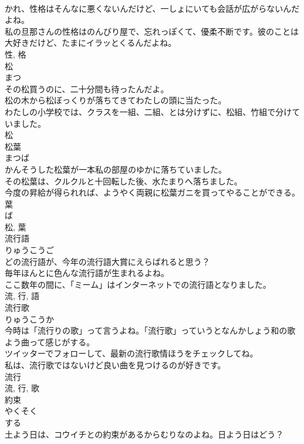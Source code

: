 \documentclass[8pt]{extreport}
\begin{document}
\begin{CJK}{UTF8}{min}
\\	かれ、性格はそんなに悪くないんだけど、一しょにいても会話が広がらないんだよね。	
\\	私の旦那さんの性格はのんびり屋で、忘れっぽくて、優柔不断です。彼のことは大好きだけど、たまにイラッとくるんだよね。	
\\	性, 格	
\\	松	
\\	まつ	
\\	その松買うのに、二十分間も待ったんだよ。	
\\	松の木から松ぼっくりが落ちてきてわたしの頭に当たった。	
\\	わたしの小学校では、クラスを一組、二組、とは分けずに、松組、竹組で分けていました。	
\\	松	
\\	松葉	
\\	まつば	
\\	かんそうした松葉が一本私の部屋のゆかに落ちていました。	
\\	その松葉は、クルクルと十回転した後、水たまりへ落ちました。	
\\	今度の昇給が得られれば、ようやく両親に松葉ガニを買ってやることができる。	
\\	葉 
\\	ば 
\\	松, 葉	
\\	流行語	
\\	りゅうこうご	
\\	どの流行語が、今年の流行語大賞にえらばれると思う？	
\\	毎年ほんとに色んな流行語が生まれるよね。	
\\	ここ数年の間に、「ミーム」はインターネットでの流行語となりました。	
\\	流, 行, 語	
\\	流行歌	
\\	りゅうこうか	
\\	今時は「流行りの歌」って言うよね。「流行歌」っていうとなんかしょう和の歌よう曲って感じがする。	
\\	ツイッターでフォローして、最新の流行歌情ほうをチェックしてね。	
\\	私は、流行歌ではないけど良い曲を見つけるのが好きです。	
\\	流行 
\\	流, 行, 歌	
\\	約束	
\\	やくそく	
\\	する 
\\	土よう日は、コウイチとの約束があるからむりなのよね。日よう日はどう？	

\end{CJK}
\end{document}
